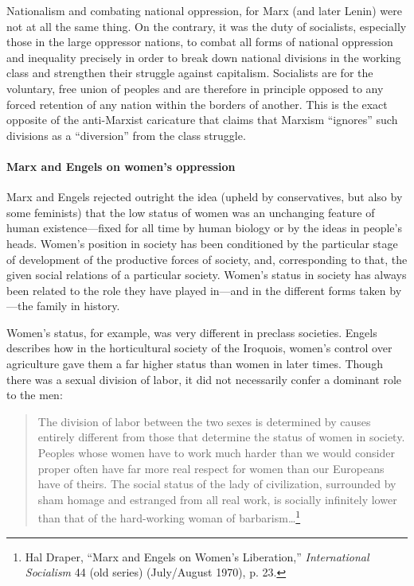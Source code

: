 Nationalism and combating national oppression, for Marx (and later Lenin) were not at all the same thing. On the contrary, it was the duty of socialists, especially those in the large oppressor nations, to combat all forms of national oppression and inequality precisely in order to break down national divisions in the working class and strengthen their struggle against capitalism. Socialists are for the voluntary, free union of peoples and are therefore in principle opposed to any forced retention of any nation within the borders of another. This is the exact opposite of the anti-Marxist caricature that claims that Marxism ``ignores'' such divisions as a ``diversion'' from the class struggle.

\paragraph{Marx and Engels on women's oppression}

Marx and Engels rejected outright the idea (upheld by conservatives, but also by some feminists) that the low status of women was an unchanging feature of human existence---fixed for all time by human biology or by the ideas in people's heads. Women's position in society has been conditioned by the particular stage of development of the productive forces of society, and, corresponding to that, the given social relations of a particular society. Women's status in society has always been related to the role they have played in---and in the different forms taken by---the family in history.

Women's status, for example, was very different in preclass societies. Engels describes how in the horticultural society of the Iroquois, women's control over agriculture gave them a far higher status than women in later times. Though there was a sexual division of labor, it did not necessarily confer a dominant role to the men:

\blockquote{The division of labor between the two sexes is determined by causes entirely different from those that determine the status of women in society. Peoples whose women have to work much harder than we would consider proper often have far more real respect for women than our Europeans have of theirs. The social status of the lady of civilization, surrounded by sham homage and estranged from all real work, is socially infinitely lower than that of the hard-working woman of barbarism\ldots\footnote{Hal Draper, ``Marx and Engels on Women's Liberation,'' \emph{International Socialism} 44 (old series) (July/August 1970), p. 23.}}

